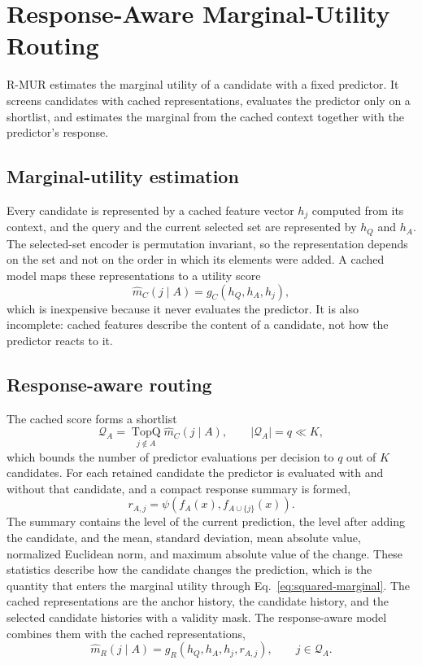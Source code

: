 \section{Response-Aware Marginal-Utility Routing}

R-MUR estimates the marginal utility of a candidate with a fixed predictor. It
screens candidates with cached representations, evaluates the predictor only on
a shortlist, and estimates the marginal from the cached context together with
the predictor's response.

\subsection{Marginal-utility estimation}

Every candidate is represented by a cached feature vector $h_j$ computed from
its context, and the query and the current selected set are represented by
$h_Q$ and $h_A$. The selected-set encoder is permutation invariant, so the
representation depends on the set and not on the order in which its elements
were added. A cached model maps these representations to a utility score
\begin{equation}
 \widehat m_C(j\mid A)=g_C(h_Q,h_A,h_j),
 \label{eq:cached}
\end{equation}
which is inexpensive because it never evaluates the predictor. It is also
incomplete: cached features describe the content of a candidate, not how the
predictor reacts to it.

\subsection{Response-aware routing}

The cached score forms a shortlist
\begin{equation}
 \mathcal Q_A=\operatorname*{TopQ}_{j\notin A}\widehat m_C(j\mid A),
 \qquad |\mathcal Q_A|=q\ll K,
 \label{eq:shortlist}
\end{equation}
which bounds the number of predictor evaluations per decision to $q$ out of
$K$ candidates. For each retained candidate the predictor is evaluated with and
without that candidate, and a compact response summary is formed,
\begin{equation}
 r_{A,j}=\psi\!\left(f_A(x),f_{A\cup\{j\}}(x)\right).
 \label{eq:response}
\end{equation}
The summary contains the level of the current prediction, the level after
adding the candidate, and the mean, standard deviation, mean absolute value,
normalized Euclidean norm, and maximum absolute value of the change. These
statistics describe how the candidate changes the prediction, which is the
quantity that enters the marginal utility through
Eq.~\eqref{eq:squared-marginal}. The cached representations are the anchor history, the candidate history, and
the selected candidate histories with a validity mask. The response-aware model
combines them with the cached representations,
\begin{equation}
 \widehat m_R(j\mid A)=g_R(h_Q,h_A,h_j,r_{A,j}),
 \qquad j\in\mathcal Q_A .
 \label{eq:rmur}
\end{equation}

